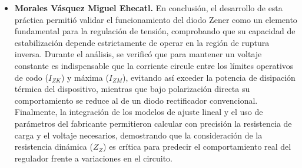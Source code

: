 \documentclass[journal]{IEEEtran}
\begin{document}
\begin{itemize}
    \item \textbf{Morales Vásquez Miguel Ehecatl.} 
    \newline En conclusión, el desarrollo de esta práctica permitió validar el funcionamiento del diodo Zener como un elemento fundamental para la regulación de tensión, comprobando que su capacidad de estabilización 
    depende estrictamente de operar en la región de ruptura inversa. Durante el análisis, se verificó que para mantener un voltaje constante es indispensable que la corriente circule entre los límites operativos de codo 
    ($I_{ZK}$) y máxima ($I_{ZM}$), evitando así exceder la potencia de disipación térmica del dispositivo, mientras que bajo polarización directa su comportamiento se reduce al de un diodo rectificador convencional. Finalmente, 
    la integración de los modelos de ajuste lineal y el uso de parámetros del fabricante permitieron calcular con precisión la resistencia de carga y el voltaje necesarios, demostrando que la consideración de la resistencia 
    dinámica ($Z_Z$) es crítica para predecir el comportamiento real del regulador frente a variaciones en el circuito.


\end{itemize}




%
\end{document}
